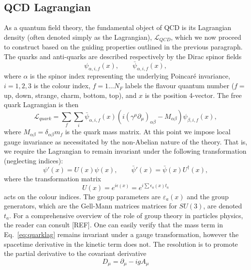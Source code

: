 \documentclass[12pt, a4paper, twoside]{book}
\newcommand{\brac}[1] {\!\left(#1\right)}
\begin{document}
\subsection{QCD Lagrangian}
As a quantum field theory, the fundamental object of QCD is its Lagrangian density (often denoted simply as the Lagrangian), \(\mathcal{L}_{QCD}\), which we now proceed to construct based on the guiding properties outlined in the previous paragraph. The quarks and anti-quarks are described respectively by the Dirac spinor fields 
\begin{equation}
\psi_{\alpha,i,f}\brac{x}, \quad\quad \bar{\psi}_{\alpha,i,f}\brac{x},
\end{equation} 
where \(\alpha\) is the spinor index representing the underlying Poincar\'e invariance, \(i=1,2,3\) is the colour index, \(f=1\ldots N_{F}\) labels the flavour quantum number (\(f=\) up, down, strange, charm, bottom, top), and \(x\) is the position 4-vector. The free quark Lagrangian is then
\begin{equation}
\label{eq:quarklag}
\mathcal{L}_{quark}=\sum_{f}\sum_{i}\bar{\psi}_{\alpha,i,f}\brac{x}\brac{i\brac{\gamma^{\mu}\partial_{\mu}}_{\alpha\beta}-M_{\alpha\beta}}\psi_{\beta,i,f}\brac{x},
\end{equation}
where \(M_{\alpha\beta}=\delta_{\alpha\beta}m_f\) is the quark mass matrix. At this point we impose local gauge invariance as necessitated by the non-Abelian nature of the theory. That is, we require the Lagrangian to remain invariant under the following transformation (neglecting indices):
\begin{equation}
\psi '\brac{x}=U\brac{x}\psi\brac{x},\quad\quad\bar{\psi}'\brac{x}=\bar{\psi}\brac{x}U^\dagger\brac{x},
\end{equation}
where the transformation matrix 
\begin{equation}
U\brac{x}=e^{i\epsilon\left(x\right)}=e^{i\sum\epsilon_a\brac{x} t_a}
\end{equation}
acts on the colour indices. The group parameters are \(\varepsilon_a\brac{x}\) and the group generators, which are the Gell-Mann matrices matrices for \(SU\brac{3}\), are denoted \(t_a\). For a comprehensive overview of the role of group theory in particles physics, the reader can consult [REF]. One can easily verify that the mass term in Eq.~\eqref{eq:quarklag} remains invariant under a gauge transformation, however the spacetime derivative in the kinetic term does not. The resolution is to promote the partial derivative to the covariant derivative 
\begin{equation}
D_\mu=\partial_\mu-igA_\mu
\end{equation}
\end{document}
